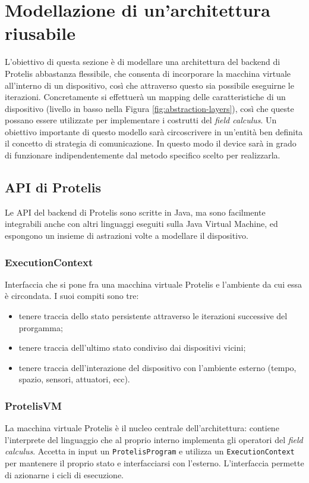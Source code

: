 \section{Modellazione di un'architettura riusabile}
\label{sec:model-def}
L'obiettivo di questa sezione è di modellare una architettura del backend di
Protelis abbastanza flessibile, che consenta di incorporare la macchina virtuale
all'interno di un dispositivo, così che attraverso questo sia possibile
eseguirne le iterazioni. Concretamente si effettuerà un mapping delle
caratteristiche di un dispositivo (livello in basso nella Figura
\ref{fig:abstraction-layers}), così che queste possano essere utilizzate per
implementare i costrutti del \textit{field calculus}. Un obiettivo importante di
questo modello sarà circoscrivere in un'entità ben definita il concetto di
strategia di comunicazione. In questo modo il device sarà in grado di funzionare
indipendentemente dal metodo specifico scelto per realizzarla.

\subsection{API di Protelis}
Le API del backend di Protelis sono scritte in Java, ma sono facilmente
integrabili anche con altri linguaggi eseguiti sulla Java Virtual Machine, ed
espongono un insieme di astrazioni volte a modellare il dispositivo.

\subsubsection{ExecutionContext}
Interfaccia che si pone fra una macchina virtuale Protelis e l'ambiente da cui
essa è circondata. I suoi compiti sono tre:
\begin{itemize}
\item tenere traccia dello stato persistente attraverso le iterazioni successive
  del prorgamma;
\item tenere traccia dell'ultimo stato condiviso dai dispositivi vicini;
\item tenere traccia dell'interazione del dispositivo con l'ambiente esterno
  (tempo, spazio, sensori, attuatori, ecc).
\end{itemize}

\subsubsection{ProtelisVM}
La macchina virtuale Protelis è il nucleo centrale dell'architettura: contiene
l'interprete del linguaggio che al proprio interno implementa gli operatori del
\textit{field calculus}. Accetta in input un \texttt{ProtelisProgram} e utilizza un
\texttt{ExecutionContext} per mantenere il proprio stato e interfacciarsi con
l'esterno. L'interfaccia permette di azionarne i cicli di esecuzione.

